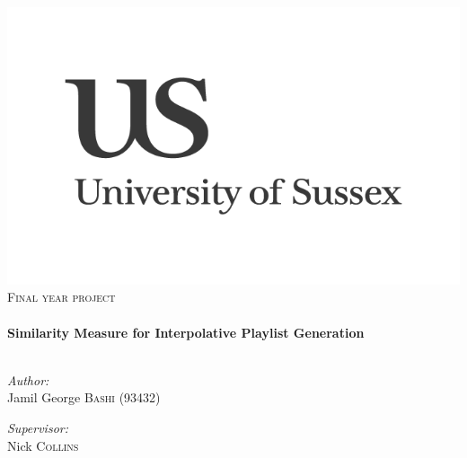 \begin{titlepage}
\begin{center}
\includegraphics[width=0.5\linewidth]{front/images/us-logo}\\[1cm]

\textsc{\Large Final year project}\\[0.5cm]

\hrulefill \\[0.4cm]
{ \huge \bfseries Similarity Measure for Interpolative Playlist Generation}\\[0.4cm]

\hrulefill \\[1.5cm]
\begin{minipage}{0.4\textwidth}
\begin{flushleft} \large
\emph{Author:}\\
Jamil George \textsc{Bashi} (93432)
\end{flushleft}
\end{minipage}
\begin{minipage}{0.4\textwidth}
\begin{flushright} \large
\emph{Supervisor:} \\
Nick \textsc{Collins}
\end{flushright}
\end{minipage}

\end{center}
\end{titlepage}

